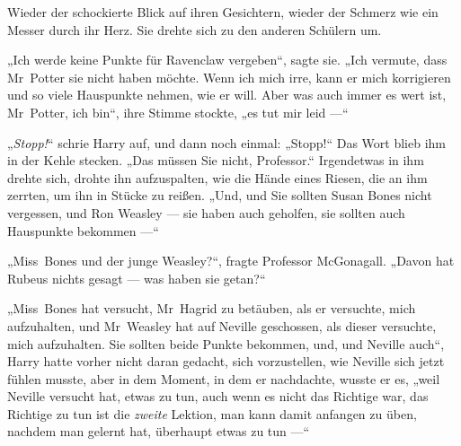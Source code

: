 
Wieder der schockierte Blick auf ihren Gesichtern, wieder der Schmerz wie ein Messer durch ihr Herz. Sie drehte sich zu den anderen Schülern um.

„Ich werde keine Punkte für Ravenclaw vergeben“, sagte sie.
„Ich vermute, dass Mr~Potter sie nicht haben möchte. Wenn ich mich irre, kann er mich korrigieren und so viele Hauspunkte nehmen, wie er will. Aber was auch immer es wert ist, Mr~Potter, ich bin“, ihre Stimme stockte, „es tut mir leid —“

\later

„\emph{Stopp!}“ schrie Harry auf, und dann noch einmal:
„Stopp!“ Das Wort blieb ihm in der Kehle stecken.
„Das müssen Sie nicht, Professor.“ Irgendetwas in ihm drehte sich, drohte ihn aufzuspalten, wie die Hände eines Riesen, die an ihm zerrten, um ihn in Stücke zu reißen.
„Und, und Sie sollten Susan Bones nicht vergessen, und Ron Weasley — sie haben auch geholfen, sie sollten auch Hauspunkte bekommen —“

„Miss~Bones und der junge Weasley?“, fragte Professor McGonagall.
„Davon hat Rubeus nichts gesagt — was haben sie getan?“

„Miss~Bones hat versucht, Mr~Hagrid zu betäuben, als er versuchte, mich aufzuhalten, und Mr~Weasley hat auf Neville geschossen, als dieser versuchte, mich aufzuhalten. Sie sollten beide Punkte bekommen, und, und Neville auch“, Harry hatte vorher nicht daran gedacht, sich vorzustellen, wie Neville sich jetzt fühlen musste, aber in dem Moment, in dem er nachdachte, wusste er es, „weil Neville versucht hat, etwas zu tun, auch wenn es nicht das Richtige war, das Richtige zu tun ist die \emph{zweite} Lektion, man kann damit anfangen zu üben, nachdem man gelernt hat, überhaupt etwas zu tun —“

